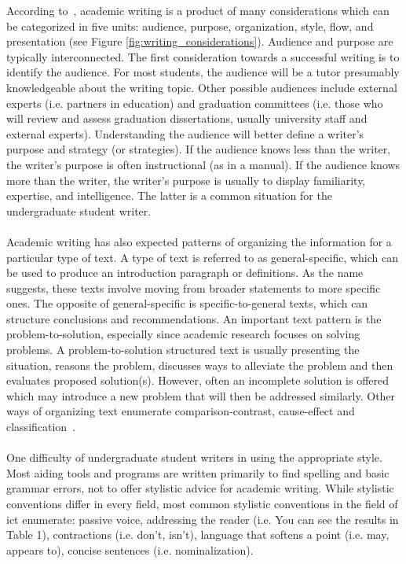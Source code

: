 According to~\citeauthor{Swales2012}, academic writing is a product of many considerations which can be categorized in five units: audience, purpose, organization, style, flow, and presentation (see Figure \ref{fig:writing_considerations}).
Audience and purpose are typically interconnected. The first consideration towards a successful writing is to identify the audience. 
For most students, the audience will be a tutor presumably knowledgeable about the writing topic. 
Other possible audiences include external experts (i.e. partners in education) and graduation committees (i.e. those who will review and assess graduation dissertations, usually university staff and external experts). 
Understanding the audience will better define a writer's purpose and strategy (or strategies). If the audience knows less than the writer, the writer’s purpose is often instructional (as in a manual). 
If the audience knows more than the writer, the writer’s purpose is usually to display familiarity, expertise, and intelligence. The latter is a common situation for the undergraduate student writer.
\\\\
Academic writing has also expected patterns of organizing the information for a particular type of text. 
A type of text is referred to as general-specific, which can be used to produce an introduction paragraph or definitions. 
As the name suggests, these texts involve moving from broader statements to more specific ones. 
The opposite of general-specific is specific-to-general texts, which can structure conclusions and recommendations. 
An important text pattern is the problem-to-solution, especially since academic research focuses on solving problems. 
A problem-to-solution structured text is usually presenting the situation, reasons the problem, discusses ways to alleviate the problem and then evaluates proposed solution(s).
However, often an incomplete solution is offered which may introduce a new problem that will then be addressed similarly. 
Other ways of organizing text enumerate comparison-contrast, cause-effect and classification~\cite{Swales2012}.
\\\\
One difficulty of undergraduate student writers in using the appropriate style. 
Most aiding tools and programs are written primarily to find spelling and basic grammar errors, not to offer stylistic advice for academic writing.
While  stylistic conventions differ in every field, most common stylistic conventions in the field of \acrshort{ict} enumerate: passive voice, addressing the reader (i.e. You can see the results in Table 1), contractions (i.e. don't, isn't), language that softens a point (i.e. may, appears to), concise sentences (i.e. nominalization).
